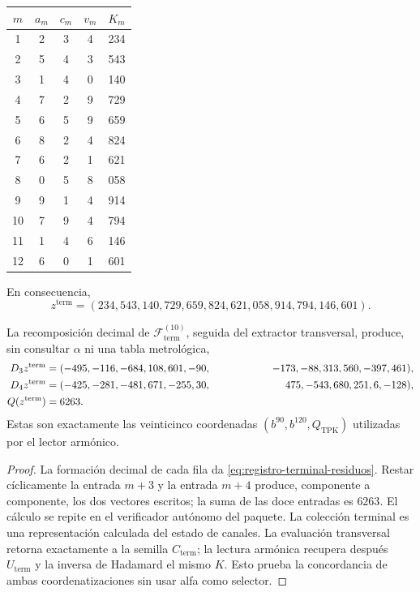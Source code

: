\begin{center}
\begin{tabular}{c@{\qquad}ccc@{\qquad}c}
\toprule
\(m\)&\(a_m\)&\(c_m\)&\(v_m\)&\(K_m\)\\
\midrule
1&2&3&4&234\\
2&5&4&3&543\\
3&1&4&0&140\\
4&7&2&9&729\\
5&6&5&9&659\\
6&8&2&4&824\\
7&6&2&1&621\\
8&0&5&8&058\\
9&9&1&4&914\\
10&7&9&4&794\\
11&1&4&6&146\\
12&6&0&1&601\\
\bottomrule
\end{tabular}
\end{center}
En consecuencia,
\begin{equation}
 z^{\mathrm{term}}
 =(234,543,140,729,659,824,621,058,914,794,146,601).
 \label{eq:registro-terminal-residuos}
\end{equation}

\begin{proposition}
\label{prop:registro-terminal-coordenadas}
La recomposición decimal de \(\mathscr F_{\mathrm{term}}^{(10)}\), seguida
del extractor transversal, produce, sin consultar \(\alpha\) ni una tabla
metrológica,
\begin{align*}
 D_3z^{\mathrm{term}}={}&(-495,-116,-684,108,601,-90,
 &\hspace{18mm}-173,-88,313,560,-397,461),\\
 D_4z^{\mathrm{term}}={}&(-425,-281,-481,671,-255,30,
 &\hspace{18mm}475,-543,680,251,6,-128),\\
 Q(z^{\mathrm{term}})={}&6263.
\end{align*}
Estas son exactamente las veinticinco coordenadas
\((b^{90},b^{120},Q_{\mathrm{TPK}})\) utilizadas por el lector armónico.
\end{proposition}

\begin{proof}
La formación decimal de cada fila da
\eqref{eq:registro-terminal-residuos}. Restar cíclicamente la entrada
\(m+3\) y la entrada \(m+4\) produce, componente a componente, los dos
vectores escritos; la suma de las doce entradas es \(6263\). El cálculo se
repite en el verificador autónomo del paquete. La colección terminal es una
representación calculada del estado de canales. La evaluación transversal retorna
exactamente a la semilla \(C_{\mathrm{term}}\); la lectura armónica recupera
después \(U_{\mathrm{term}}\) y la inversa de Hadamard el mismo \(K\). Esto
prueba la concordancia de ambas coordenatizaciones sin usar alfa como selector.
\end{proof}

